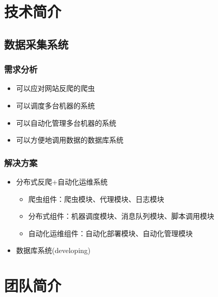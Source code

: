 \documentclass{beamer}
\begin{document}
\section{技术简介}
\subsection{数据采集系统}
\begin{frame}
\frametitle{需求分析}
\begin{itemize}
  \item 可以应对网站反爬的爬虫
  \item 可以调度多台机器的系统
  \item 可以自动化管理多台机器的系统
  \item 可以方便地调用数据的数据库系统
\end{itemize}
\end{frame}

\begin{frame}
\frametitle{解决方案}
\begin{itemize}
  \item 分布式反爬+自动化运维系统
  \begin{itemize}
    \item 爬虫组件：爬虫模块、代理模块、日志模块
    \item 分布式组件：机器调度模块、消息队列模块、脚本调用模块
    \item 自动化运维组件：自动化部署模块、自动化管理模块
  \end{itemize}
  \item 数据库系统(developing)
\end{itemize}
\end{frame}

\section{团队简介}
\end{document}
